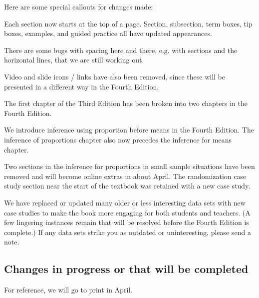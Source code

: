 \noindent%
Here are some special callouts for changes made:
\begin{description}
\item[Stylistic.]
    Each section now starts at the top of a page.
    Section, subsection, term boxes, tip boxes,
    examples, and guided practice
    all have updated appearances.

    There are some bugs with spacing here and there,
    e.g. with sections and the horizontal lines,
    that we are still working out.

    Video and slide icons / links have also been removed,
    since these will be presented in a different way
    in the Fourth Edition.
\item[Graphics and statistical summaries get their own chapter.]
    The first chapter of the Third Edition has been
    broken into two chapters in the Fourth Edition.
\item[Inference: proportions before means.]
    We introduce inference using proportion before means
    in the Fourth Edition.
    The inference of proportions chapter also now
    precedes the inference for means chapter.
\item[Simulation and randomization.]
    Two sections in the inference for proportions
    in small sample situations have been removed
    and will become online extras in about April.
    The randomization case study section near the start of the
    textbook was retained with a new case study.
\item[Lots of new examples.]
    We have replaced or updated many older or less interesting
    data sets with new case studies to make the book more
    engaging for both students and teachers.
    (A few lingering instances remain that will be resolved
    before the Fourth Edition is complete.)
    If any data sets strike you as outdated or uninteresting,
    please send a note.
\item

\end{description}


\subsection*{Changes in progress or that will be completed}

\noindent%
For reference, we will go to print in April.

